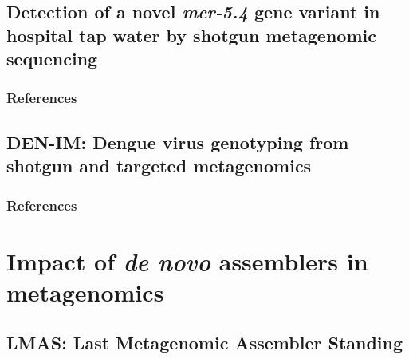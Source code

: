 \documentclass[12pt,a4paper,twoside,openright]{book}
\begin{document}
\begin{sloppy}
\newpage
\thispagestyle{empty}
\chapter{Detection of a novel \textit{mcr-5.4} gene variant in hospital tap water by shotgun metagenomic sequencing\label{ch:paper2}}

\thispagestyle{empty}
\clearpage \thispagestyle{empty}\mbox{}\clearpage
\newpage
\begin{refsection}

\newpage
\section{References}
\printbibliography[heading=none]
\end{refsection}

\newpage
\thispagestyle{empty}
\chapter{DEN-IM: Dengue virus genotyping from shotgun and targeted metagenomics\label{ch:paper3}}

\thispagestyle{empty}
\clearpage \thispagestyle{empty}\mbox{}\clearpage
\newpage
\begin{refsection}

\newpage
\section{References}
\printbibliography[heading=none]
\end{refsection}

\part{Impact of \textit{de novo} assemblers in metagenomics}
\newpage
\thispagestyle{empty}
\chapter{LMAS: Last Metagenomic Assembler Standing\label{ch:paper4}}


\end{sloppy}
\end{document}
